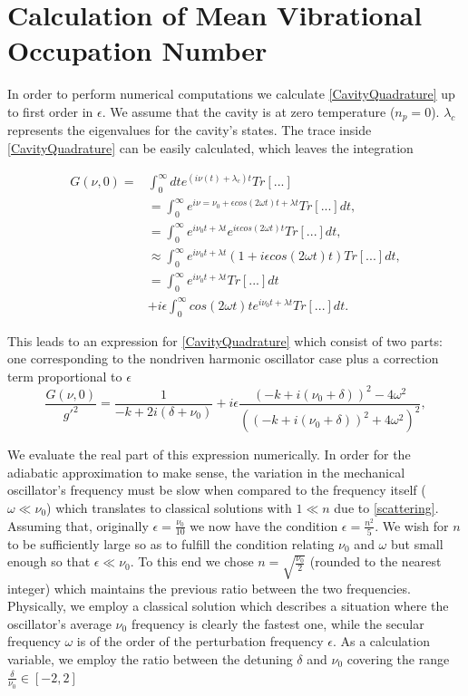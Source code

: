 \documentclass[reprint, amsmath,amssymb, aps,pra]{revtex4-1}
\begin{document}
\section{Calculation of Mean Vibrational Occupation Number}\label{NumCal}

In order to perform numerical computations we calculate
\eqref{CavityQuadrature} up to first order in $\epsilon$. We assume
that the cavity is at zero temperature ($n_p=0$). $\lambda_c$
represents the eigenvalues for the cavity's states. The trace inside
\eqref{CavityQuadrature} can be easily calculated, which leaves the
integration

\begin{align}
G(\nu,0)=&\int_0^\infty dt e^{(i\nu(t)+\lambda_c) t}Tr[...]\nonumber\\
&= \int_0^\infty e^{i \nu = \nu_0 + \epsilon cos(2\omega t) t + \lambda t} Tr[...]dt, \nonumber\\
&=\int_0^\infty e^{i \nu_0 t + \lambda t}e^{i \epsilon cos(2\omega t)t} Tr[...]dt, \nonumber\\
&\approx \int_0^\infty e^{i \nu_0 t + \lambda t}(1+i \epsilon cos(2\omega t)t) Tr[...]dt, \nonumber\\
&=\int_0^\infty e^{i \nu_0 t + \lambda t}Tr[...]dt\nonumber\\
&+i\epsilon\int_0^\infty cos(2\omega t)t e^{i \nu_0 t + \lambda t}Tr[...]dt.\nonumber
\end{align}

This leads to an expression for \eqref{CavityQuadrature} which consist
of two parts: one corresponding to the nondriven harmonic
oscillator case plus a correction term proportional to $\epsilon$
\begin{equation}
\frac{G(\nu,0)}{g'^2}= \frac{1}{-k + 2i(\delta + \nu_0)} +i\epsilon\frac{(-k + i(\nu_0 + \delta))^2 - 4\omega^2}{((-k + i(\nu_0 + \delta))^2 + 4\omega^2)^2},
\end{equation} %

We evaluate the real part of this expression numerically. In order for the
adiabatic approximation to make sense, the variation in the mechanical
oscillator's frequency must be slow when compared to the frequency
itself ($\omega \ll \nu_0$) which translates to classical solutions
with $1 \ll n$ due to \eqref{scattering}. Assuming that, originally
$\epsilon = \frac{\nu_0}{10}$ we now have the condition
$\epsilon = \frac{n^2}{5}$. We wish for $n$ to be sufficiently large
so as to fulfill the condition relating $\nu_0$ and $\omega$ but small
enough so that $\epsilon \ll \nu_0$. To this end we chose
$n=\sqrt{\frac{\nu_0}{2}}$ (rounded to the nearest integer) which
maintains the previous ratio between the two frequencies. Physically, we employ a classical solution which describes a situation where the oscillator's average $\nu_0$ frequency is clearly the fastest one, while the secular frequency $\omega$ is of the order of the perturbation frequency $\epsilon$. As a
calculation variable, we employ the ratio between the detuning
$\delta$ and $\nu_0$ covering the range
$\frac{\delta}{\nu_0} \in [-2,2]$
\end{document}

